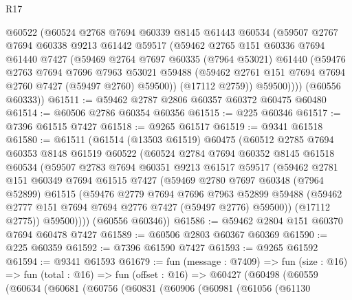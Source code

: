 \begin{lexlean}{R17}
\begin{coremodule}
        @60522
        (@60524
          @2768
          @7694
          @60339
          @8145
          @61443
          @60534
          (@59507
            @2767
            @7694
            @60338
            @9213
            @61442
            @59517
            (@59462
              @2765
              @151
              @60336
              @7694
              @61440
              @7427
              (@59469
                @2764
                @7697
                @60335
                (@7964 @53021)
                @61440
                (@59476
                  @2763
                  @7694
                  @7696
                  @7963
                  @53021
                  @59488
                  (@59462 @2761 @151 @7694 @7694 @2760 @7427 (@59497 @2760) @59500))
                (@17112 @2759))
              @59500))))
      (@60556 @60333))
@61511 := @59462 @2787 @2806 @60357 @60372 @60475 @60480
@61514 := @60506 @2786 @60354 @60356
@61515 := @225 @60346
@61517 := @7396 @61515 @7427
@61518 := @9265 @61517
@61519 := @9341 @61518
@61580 := @61511
    (@61514
      (@13503 @61519)
      @60475
      (@60512
        @2785
        @7694
        @60353
        @8148
        @61519
        @60522
        (@60524
          @2784
          @7694
          @60352
          @8145
          @61518
          @60534
          (@59507
            @2783
            @7694
            @60351
            @9213
            @61517
            @59517
            (@59462
              @2781
              @151
              @60349
              @7694
              @61515
              @7427
              (@59469
                @2780
                @7697
                @60348
                (@7964 @52899)
                @61515
                (@59476
                  @2779
                  @7694
                  @7696
                  @7963
                  @52899
                  @59488
                  (@59462 @2777 @151 @7694 @7694 @2776 @7427 (@59497 @2776) @59500))
                (@17112 @2775))
              @59500))))
      (@60556 @60346))
@61586 := @59462 @2804 @151 @60370 @7694 @60478 @7427
@61589 := @60506 @2803 @60367 @60369
@61590 := @225 @60359
@61592 := @7396 @61590 @7427
@61593 := @9265 @61592
@61594 := @9341 @61593
@61679 := fun (message : @7409) =>
  fun (size : @16) =>
  fun (total : @16) =>
  fun (offset : @16) =>
  @60427
    (@60498
      (@60559
        (@60634
          (@60681
            (@60756
              (@60831
                (@60906
                  (@60981
                    (@61056
                      (@61130

\end{coremodule}
\end{lexlean}
